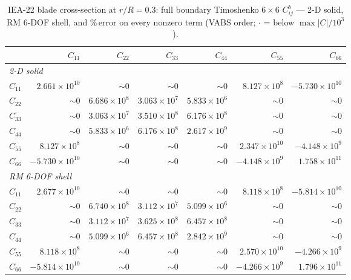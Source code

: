 \begin{table}[t]\centering\small
\caption{IEA-22 blade cross-section at $r/R=0.3$: full boundary Timoshenko $6\times6$ $C^{b}_{ij}$ --- 2-D solid, RM 6-DOF shell, and \%\,error on every nonzero term (VABS order; $\cdot$ = below $\max|C|/10^3$).}\label{tab:iea_iea_r030}
\setlength{\tabcolsep}{4pt}\renewcommand{\arraystretch}{1.1}
\begin{tabular}{lrrrrrr}
\toprule
 & $C_{11}$ & $C_{22}$ & $C_{33}$ & $C_{44}$ & $C_{55}$ & $C_{66}$\\
\midrule
\multicolumn{7}{l}{\textit{2-D solid}}\\
$C_{11}$ & $2.661\!\times\!10^{10}$ & $\sim\!0$ & $\sim\!0$ & $\sim\!0$ & $8.127\!\times\!10^{8}$ & $-5.730\!\times\!10^{10}$\\
$C_{22}$ & $\sim\!0$ & $6.686\!\times\!10^{8}$ & $3.063\!\times\!10^{7}$ & $5.833\!\times\!10^{6}$ & $\sim\!0$ & $\sim\!0$\\
$C_{33}$ & $\sim\!0$ & $3.063\!\times\!10^{7}$ & $3.510\!\times\!10^{8}$ & $6.176\!\times\!10^{8}$ & $\sim\!0$ & $\sim\!0$\\
$C_{44}$ & $\sim\!0$ & $5.833\!\times\!10^{6}$ & $6.176\!\times\!10^{8}$ & $2.617\!\times\!10^{9}$ & $\sim\!0$ & $\sim\!0$\\
$C_{55}$ & $8.127\!\times\!10^{8}$ & $\sim\!0$ & $\sim\!0$ & $\sim\!0$ & $2.347\!\times\!10^{10}$ & $-4.148\!\times\!10^{9}$\\
$C_{66}$ & $-5.730\!\times\!10^{10}$ & $\sim\!0$ & $\sim\!0$ & $\sim\!0$ & $-4.148\!\times\!10^{9}$ & $1.758\!\times\!10^{11}$\\
\midrule
\multicolumn{7}{l}{\textit{RM 6-DOF shell}}\\
$C_{11}$ & $2.677\!\times\!10^{10}$ & $\sim\!0$ & $\sim\!0$ & $\sim\!0$ & $8.118\!\times\!10^{8}$ & $-5.814\!\times\!10^{10}$\\
$C_{22}$ & $\sim\!0$ & $6.740\!\times\!10^{8}$ & $3.112\!\times\!10^{7}$ & $5.099\!\times\!10^{6}$ & $\sim\!0$ & $\sim\!0$\\
$C_{33}$ & $\sim\!0$ & $3.112\!\times\!10^{7}$ & $3.625\!\times\!10^{8}$ & $6.457\!\times\!10^{8}$ & $\sim\!0$ & $\sim\!0$\\
$C_{44}$ & $\sim\!0$ & $5.099\!\times\!10^{6}$ & $6.457\!\times\!10^{8}$ & $2.842\!\times\!10^{9}$ & $\sim\!0$ & $\sim\!0$\\
$C_{55}$ & $8.118\!\times\!10^{8}$ & $\sim\!0$ & $\sim\!0$ & $\sim\!0$ & $2.570\!\times\!10^{10}$ & $-4.266\!\times\!10^{9}$\\
$C_{66}$ & $-5.814\!\times\!10^{10}$ & $\sim\!0$ & $\sim\!0$ & $\sim\!0$ & $-4.266\!\times\!10^{9}$ & $1.796\!\times\!10^{11}$\\

\end{tabular}
\end{table}
